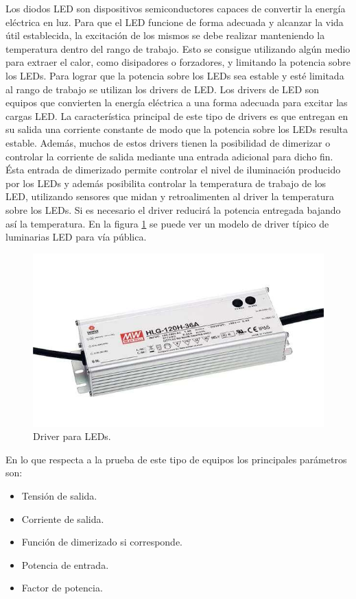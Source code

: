 Los diodos LED son dispositivos semiconductores capaces de convertir la energía eléctrica en luz. Para que el LED funcione de forma adecuada y alcanzar la vida útil establecida, la excitación de los mismos se debe realizar manteniendo la temperatura dentro del rango de trabajo. Esto se consigue utilizando algún medio para extraer el calor, como disipadores o forzadores, y limitando la potencia sobre los LEDs. Para lograr que la potencia sobre los LEDs sea estable y esté limitada al rango de trabajo se utilizan los drivers de LED. 
Los drivers de LED son equipos que convierten la energía eléctrica a una forma adecuada para excitar las cargas LED. La característica principal de este tipo de drivers es que entregan en su salida una corriente constante de modo que la potencia sobre los LEDs resulta estable. Además, muchos de estos drivers tienen la posibilidad de dimerizar o controlar la corriente de salida mediante una entrada adicional para dicho fin. Ésta entrada de dimerizado permite controlar el nivel de iluminación producido por los LEDs y además posibilita controlar la temperatura de trabajo de los LED, utilizando sensores que midan y retroalimenten al driver la temperatura sobre los LEDs. Si es necesario el driver reducirá la potencia entregada bajando así la temperatura.
En la figura \ref{fig:Driver} se puede ver un modelo de driver típico de luminarias LED para vía pública.

\begin{figure}[ht]
	\centering
	\includegraphics[scale=.6]{./Figures/Driver.jpg}
	\caption{Driver para LEDs.}
	\label{fig:Driver}
\end{figure}


En lo que respecta a la prueba de este tipo de equipos los principales parámetros son:
\begin{itemize}
	\item Tensión de salida.
	\item Corriente de salida.
	\item Función de dimerizado si corresponde.
	\item Potencia de entrada.
	\item Factor de potencia.
\end{itemize}

